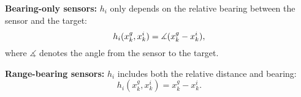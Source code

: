 	\textbf{Bearing-only sensors:} 
	$h_i$ only depends on the relative bearing between the sensor and the target:
	\begin{equation*}
		h_i(x^g_k,x^i_k)=\measuredangle (x^g_k-x^i_k),
	\end{equation*}
	where $\measuredangle$ denotes the angle from the sensor to the target.
	
	\textbf{Range-bearing sensors:} $h_i$ includes both the relative distance and bearing: %
	\begin{equation*}
		h_i(x^g_k,x^i_k)=x^g_k-x^i_k.
	\end{equation*}
	
